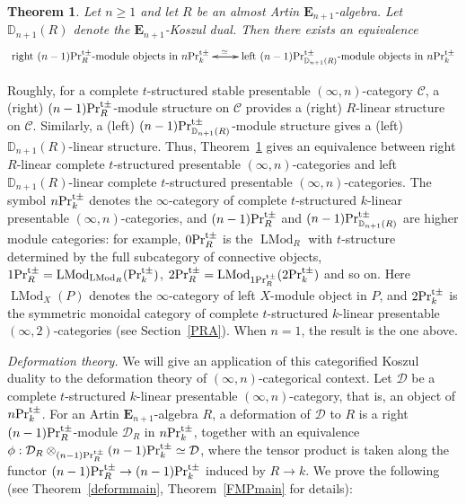 \documentclass[leqno,12pt]{amsart}
\theoremstyle{plain}
\newtheorem{Theorem}{Theorem}[section]
\theoremstyle{definition}
\newcommand{\DD}{\mathbb{D}}
\newcommand{\DDD}{\mathcal{D}}
\newcommand{\CCC}{\mathcal{C}}
\newcommand{\PRTTT}{\textup{Pr}^{\textup{t}\pm}}
\newcommand{\LMod}{\operatorname{LMod}}
\begin{document}
\begin{Theorem}
\label{intromain1}
Let $n\ge1$ and let $R$ be an almost Artin $\mathbf{E}_{n+1}$-algebra. Let $\DD_{n+1}(R)$ denote the $\mathbf{E}_{n+1}$-Koszul dual.
Then there exists an equivalence
\[
\xymatrix{
\textup{right}\ (n-1)\PRTTT_{R}\textup{-module objects in}\ n\PRTTT_k \ar[r]^(0.48){\simeq} & \textup{left}\ (n-1)\PRTTT_{\DD_{n+1}(R)}\textup{-module objects in}\ n\PRTTT_k  \ar[l]
}
\]
\end{Theorem}


Roughly, for a complete $t$-structured
stable presentable $(\infty,n)$-category $\CCC$, a (right) $(n-1)\PRTTT_{R}$-module structure on $\CCC$ provides a (right) $R$-linear structure on $\CCC$.
Similarly, a (left) $(n-1)\PRTTT_{\DD_{n+1}(R)}$-module structure gives a (left) $\DD_{n+1}(R)$-linear structure.
Thus, Theorem~\ref{intromain1} gives an equivalence between right $R$-linear complete $t$-structured presentable $(\infty,n)$-categories and left $\DD_{n+1}(R)$-linear complete $t$-structured presentable $(\infty,n)$-categories.
The symbol $n\PRTTT_k$ denotes the $\infty$-category of complete $t$-structured $k$-linear presentable $(\infty,n)$-categories,
and $(n-1)\PRTTT_{R}$ and $(n-1)\PRTTT_{\DD_{n+1}(R)}$ are higher module categories: 
for example, $0\PRTTT_{R}$ is the $\LMod_R$ with $t$-structure determined by the full subcategory of connective objects,
$1\PRTTT_{R}=\LMod_{\LMod_R}(\PRTTT_k)$, $2\PRTTT_R=\LMod_{1\PRTTT_{R}}(2\PRTTT_k)$ and so on.
Here $\LMod_{X}(P)$ denotes the $\infty$-category of left $X$-module object in $P$, and $2\PRTTT_k$ is the symmetric monoidal category of complete $t$-structured $k$-linear presentable $(\infty,2)$-categories (see Section~\ref{PRA}). When $n=1$, the result is the one above.


\vspace{3mm}


{\it Deformation theory.}
We will give an application of this categorified Koszul duality to the deformation theory of $(\infty,n)$-categorical context.
Let $\DDD$ be a complete $t$-structured $k$-linear presentable $(\infty,n)$-category, that is, an object of $n\PRTTT_k$.
For an Artin $\mathbf{E}_{n+1}$-algebra $R$, a deformation of $\DDD$ to $R$
is a right $(n-1)\PRTTT_R$-module $\DDD_R$ in $n\PRTTT_k$, together with an equivalence $\phi:\DDD_R\otimes_{(n-1)\PRTTT_R}(n-1)\PRTTT_k\simeq \DDD$,
where the tensor product is taken along the functor $(n-1)\PRTTT_R\to(n-1)\PRTTT_k$ induced by $R\to k$.
We prove the following (see Theorem~\ref{deformmain}, Theorem~\ref{FMPmain} for details):
\end{document}
